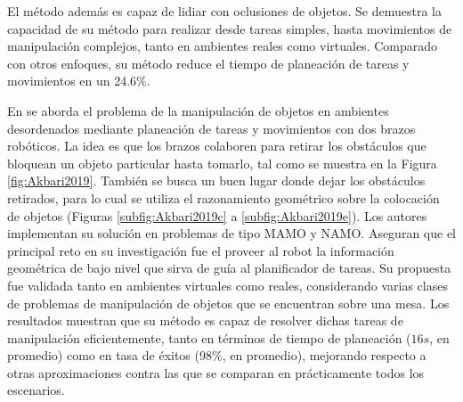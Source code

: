 El método además es capaz de lidiar con oclusiones de objetos.
Se demuestra la capacidad de su método para realizar desde tareas simples, hasta movimientos de manipulación complejos, tanto en ambientes reales como virtuales.
Comparado con otros enfoques, su método reduce el tiempo de planeación de tareas y movimientos en un 24.6\!\%.

En \cite{Akbari2019} se aborda el problema de la manipulación de objetos en ambientes desordenados mediante planeación de tareas y movimientos con dos brazos robóticos.
La idea es que los brazos colaboren para retirar los obstáculos que bloquean un objeto particular hasta tomarlo, tal como se muestra en la Figura \ref{fig:Akbari2019}.
También se busca un buen lugar donde dejar los obstáculos retirados, para lo cual se utiliza el razonamiento geométrico sobre la colocación de objetos (Figuras \ref{subfig:Akbari2019c} a \ref{subfig:Akbari2019e}).
Los autores implementan su solución en problemas de tipo MAMO y NAMO.
Aseguran que el principal reto en su investigación fue el proveer al robot la información geométrica de bajo nivel que sirva de guía al planificador de tareas.
Su propuesta fue validada tanto en ambientes virtuales como reales, considerando varias clases de problemas de manipulación de objetos que se encuentran sobre una mesa.
Los resultados muestran que su método es capaz de resolver dichas tareas de manipulación eficientemente, tanto en términos de tiempo de planeación ($16s$, en promedio) como en tasa de éxitos (98\!\%, en promedio), mejorando respecto a otras aproximaciones contra las que se comparan en prácticamente todos los escenarios.
%
